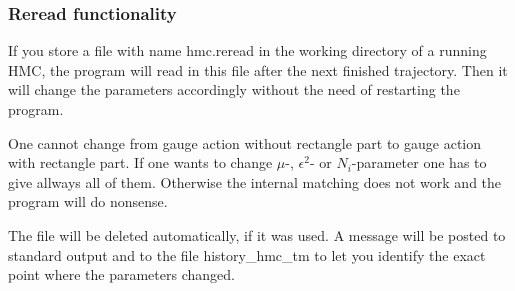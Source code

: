 \subsubsection{Reread functionality}

If you store a file with name {\ttfamily hmc.reread} in the working
directory of a running HMC, the program will read in this file after
the next finished trajectory. Then it will change the parameters
accordingly without the need of restarting the program. 

One cannot change from gauge action without rectangle part to gauge
action with rectangle part. If one wants to change $\mu$-,
$\epsilon^2$- or $N_i$-parameter one has to give allways all of
them. Otherwise the internal matching does not work and the program
will do nonsense.

The file will be deleted automatically, if it was used. A message will
be posted to standard output and to the file {\ttfamily
  history\_hmc\_tm} to let you identify the exact point where the
parameters changed.

